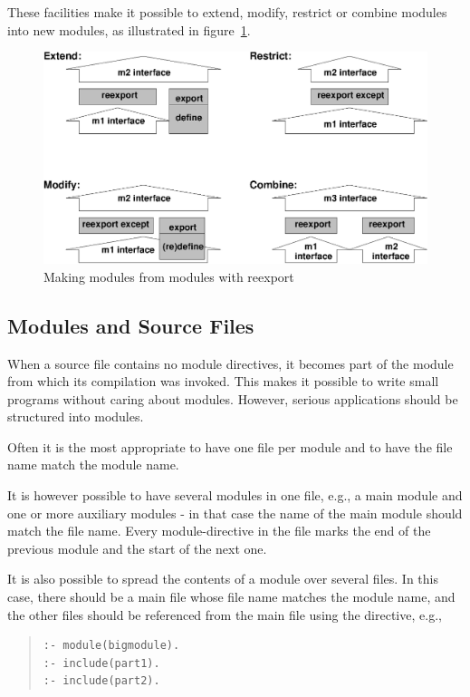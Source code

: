 These facilities make it possible to extend, modify, restrict or
combine modules into new modules, as illustrated in figure~\ref{reexport}.

\begin{figure}[hbt]
\begin{center}
\includegraphics{reexport.eps}
\end{center}
\caption{Making modules from modules with reexport}
\label{reexport}
\end{figure}


\subsection{Modules and Source Files}

When a source file contains no module directives, it becomes part of
the module from which its compilation was invoked.  This makes it
possible to write small programs without caring about modules.
However, serious applications should be structured into modules.

Often it is the most appropriate to have one file per module and to
have the file name match the module name.

It is however possible to have several modules in one file, e.g., a
main module and one or more auxiliary modules - in that
case the name of the main module should match the file name.
Every module-directive in the file marks the end of the previous
module and the start of the next one.

It is also possible to spread the contents of a module over several
files. In this case, there should be a main file whose file name
matches the module name, and the other files should be referenced
from the main file using the
 directive, e.g.,
\begin{quote}
\begin{verbatim}
:- module(bigmodule).
:- include(part1).
:- include(part2).
\end{verbatim}
\end{quote}



